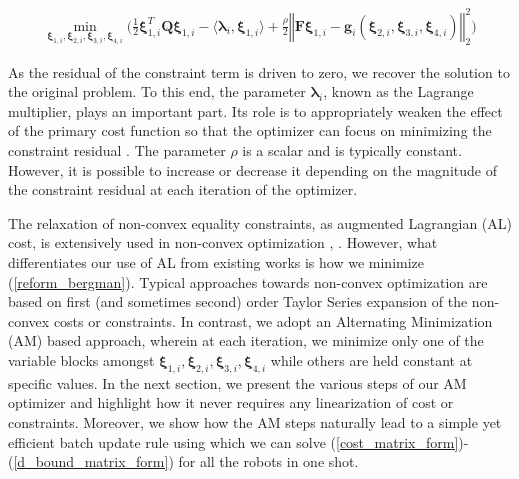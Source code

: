 \begin{align}
 \min_{\boldsymbol{\xi}_{1,i},\boldsymbol{\xi}_{2,i},\boldsymbol{\xi}_{3,i}, \boldsymbol{\xi}_{4,i} } 
 \Big(\frac{1}{2}\boldsymbol{\xi}_{1,i}^T\textbf{Q}\boldsymbol{\xi}_{1,i} 
 - \langle\boldsymbol{\lambda}_{i}, \boldsymbol{\xi}_{1,i}\rangle 
 +\frac{\rho}{2}\left\Vert \textbf{F} \boldsymbol{\xi}_{1,i}  
 -\textbf{g}_{i}(\boldsymbol{\xi}_{2,i},\boldsymbol{\xi}_{3,i}, \boldsymbol{\xi}_{4,i}) \right \Vert_2^2 \Big) %
 \label{reform_bergman}
 \end{align}
 
\noindent As the residual of the constraint term is driven to zero, we recover the solution to the original problem. To this end, the parameter $\boldsymbol{\lambda}_{i}$, known as the Lagrange multiplier, plays an important part. Its role is to appropriately weaken the effect of the primary cost function so that the optimizer can focus on minimizing the constraint residual \citep{admm_neural}. The parameter $\rho$ is a scalar and is typically constant. However, it is possible to increase or decrease it depending on the magnitude of the constraint residual at each iteration of the optimizer.
 
The relaxation of non-convex equality constraints, as augmented Lagrangian (AL) cost, is extensively used in non-convex optimization \citep{admm_non_convex_1}, \citep{admm_non_convex_2}. However, what differentiates our use of AL from existing works is how we minimize (\ref{reform_bergman}). Typical approaches towards non-convex optimization are based on first (and sometimes second) order Taylor Series expansion of the non-convex costs or constraints. In contrast, we adopt an Alternating Minimization (AM) based approach, wherein at each iteration, we minimize only one of the variable blocks amongst $\boldsymbol{\xi}_{1, i}, \boldsymbol{\xi}_{2, i}, \boldsymbol{\xi}_{3, i}, \boldsymbol{\xi}_{4, i}  $ while others are held constant at specific values. In the next section, we present the various steps of our AM optimizer and highlight how it never requires any linearization of cost or constraints. Moreover, we show how the AM steps naturally lead to a simple yet efficient batch update rule using which we can solve (\ref{cost_matrix_form})-(\ref{d_bound_matrix_form}) for all the robots in one shot.



